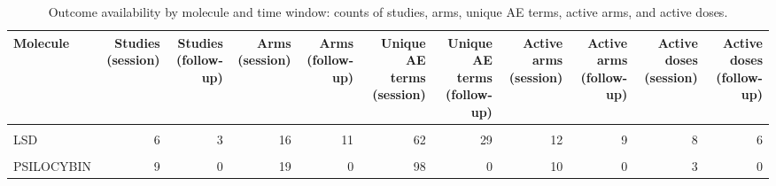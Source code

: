 \begin{table}[!h]
\centering
\caption{\label{tab:tab:outcome_availability_by_window}Outcome availability by molecule and time window: counts of studies, arms, unique AE terms, active arms, and active doses.}
\centering
\begin{tabular}[t]{lrrrrrrrrrr}
\toprule
Molecule & Studies (session) & Studies (follow-up) & Arms (session) & Arms (follow-up) & Unique AE terms (session) & Unique AE terms (follow-up) & Active arms (session) & Active arms (follow-up) & Active doses (session) & Active doses (follow-up)\\
\midrule
\cellcolor{gray!10}{AYAHUASCA} & \cellcolor{gray!10}{2} & \cellcolor{gray!10}{0} & \cellcolor{gray!10}{4} & \cellcolor{gray!10}{0} & \cellcolor{gray!10}{12} & \cellcolor{gray!10}{0} & \cellcolor{gray!10}{2} & \cellcolor{gray!10}{0} & \cellcolor{gray!10}{1} & \cellcolor{gray!10}{0}\\
LSD & 6 & 3 & 16 & 11 & 62 & 29 & 12 & 9 & 8 & 6\\
\cellcolor{gray!10}{MDMA} & \cellcolor{gray!10}{10} & \cellcolor{gray!10}{3} & \cellcolor{gray!10}{23} & \cellcolor{gray!10}{7} & \cellcolor{gray!10}{70} & \cellcolor{gray!10}{22} & \cellcolor{gray!10}{12} & \cellcolor{gray!10}{4} & \cellcolor{gray!10}{5} & \cellcolor{gray!10}{2}\\
PSILOCYBIN & 9 & 0 & 19 & 0 & 98 & 0 & 10 & 0 & 3 & 0\\
\bottomrule
\end{tabular}
\end{table}
